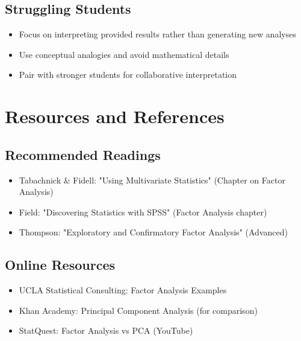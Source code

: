 \documentclass[11pt,a4paper]{article}
\begin{document}
\subsection{Struggling Students}
\begin{itemize}
    \item Focus on interpreting provided results rather than generating new analyses
    \item Use conceptual analogies and avoid mathematical details
    \item Pair with stronger students for collaborative interpretation
\end{itemize}

\section{Resources and References}

\subsection{Recommended Readings}
\begin{itemize}
    \item Tabachnick \& Fidell: "Using Multivariate Statistics" (Chapter on Factor Analysis)
    \item Field: "Discovering Statistics with SPSS" (Factor Analysis chapter)
    \item Thompson: "Exploratory and Confirmatory Factor Analysis" (Advanced)
\end{itemize}

\subsection{Online Resources}
\begin{itemize}
    \item UCLA Statistical Consulting: Factor Analysis Examples
    \item Khan Academy: Principal Component Analysis (for comparison)
    \item StatQuest: Factor Analysis vs PCA (YouTube)
\end{itemize}
\end{document}
